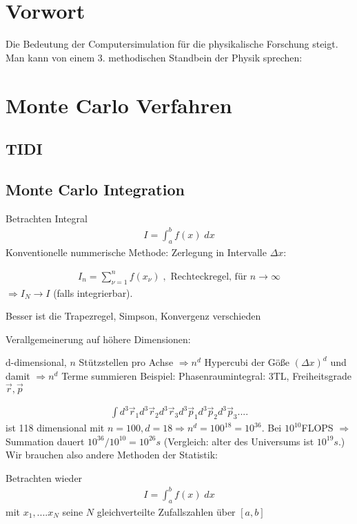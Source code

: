 \documentclass[12pt]{article}
\begin{document}
\section*{Vorwort}
Die Bedeutung der Computersimulation für die physikalische Forschung steigt. Man kann von einem 3. methodischen Standbein der Physik sprechen: 

\section{Monte Carlo Verfahren}
\subsection{TIDI}
\subsection{ Monte Carlo Integration}
Betrachten Integral 
\begin{align}
I= \int_a^b f(x) \; dx
\end{align}
Konventionelle nummerische Methode: Zerlegung in Intervalle $\Delta x$:

\begin{align}
I_n= \sum_{\nu =1}^n f(x_\nu) \; , \mbox{ Rechteckregel, für } n \to \infty
\end{align}
$\Rightarrow I_N \to I$ (falls integrierbar).

Besser ist die Trapezregel, Simpson, Konvergenz verschieden

Verallgemeinerung auf höhere Dimensionen:

d-dimensional, $n$ Stützstellen pro Achse $\Rightarrow n^d$ Hypercubi der Göße $(\Delta x)^d$ und damit $\Rightarrow n^d$ Terme summieren
Beispiel: Phasenraumintegral: 3TL, Freiheitsgrade $\vec{r}, \vec{p}$

\begin{align}
\int d^3 \vec{r}_1 d^3 \vec{r}_2 d^3 \vec{r}_3 d^3 \vec{p}_1 d^3 \vec{p}_2 d^3 \vec{p}_3 .... 
\end{align} %
ist 118 dimensional mit $n=100, d=18 \Rightarrow n^d=100^18=10^36$. Bei $10^10$FLOPS
$\Rightarrow$ Summation dauert $10^{36 } / 10^{10}= 10^{26}s$ (Vergleich: alter des Universums ist $10^{19}s$.)
Wir brauchen also andere Methoden der Statistik:

Betrachten wieder 
\begin{align}
I= \int_a^b f(x) \; dx
\end{align}
mit $x_1,....x_N$ seine $N$ gleichverteilte Zufallszahlen über $[a,b]$ %
\end{document}
